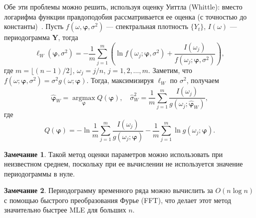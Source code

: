 \documentclass[specialist,
substylefile = spbu_report.rtx,
subf,href,colorlinks=true, 12pt]{disser}
\theoremstyle{definition}
\newtheorem{remark}{Замечание}[section]
\begin{document}
Обе эти проблемы можно решить, используя оценку Уиттла (Whittle): вместо логарифма функции правдоподобия рассматривается ее оценка (с точностью до константы)~\cite{Whittle1953}. Пусть $f(\omega, \bm\varphi, \sigma^2)$ --- спектральная плотность $\{Y_t\}$, $I(\omega)$ --- периодограмма $\bm Y$, тогда
\[
	\ell_W(\bm\varphi, \sigma^2)=-\frac1m\sum_{j=1}^m\left(\ln f(\omega_j; \bm\varphi, \sigma^2) + \frac{I(\omega_j)}{f(\omega_j; \bm\varphi, \sigma^2)}\right),
\]
где $m=\lfloor(n-1)/2\rfloor$, $\omega_j = j / n$, $j=1,2,\ldots,m$. Заметим, что $f(\omega; \bm\varphi, \sigma^2)=\sigma^2 g(\omega; \bm\varphi)$. Тогда, максимизируя $\ell_W$ по $\sigma^2$, получаем
\[
	\widehat{\bm\varphi}_W = \operatorname*{argmax}_{\bm\varphi}Q(\bm\varphi),\quad \widehat\sigma_W^2=\frac1m \sum_{j=1}^m\frac{I(\omega_j)}{g(\omega_j; \widehat{\bm\varphi}_W)},
\]
где
\[
	Q(\bm\varphi)=-\ln\frac1m \sum_{j=1}^m\frac{I(\omega_j)}{g(\omega_j; \bm\varphi)} - \frac1m \sum_{j=1}^m\ln g(\omega_j; \bm\varphi).
\]
\begin{remark}
	Такой метод оценки параметров можно использовать при неизвестном среднем, поскольку при ее вычислении не используется значение периодограммы в нуле.
\end{remark}
\begin{remark}
	Периодограмму временного ряда можно вычислить за $O(n\log n)$ с помощью быстрого преобразования Фурье (FFT), что делает этот метод значительно быстрее MLE для больших $n$.
\end{remark}
\end{document}
